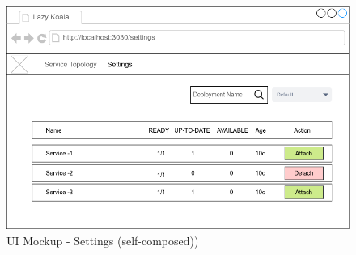 \begin{figure}[H]
    \includegraphics[width=14cm]{assets/system-design/ui-settings.png}
    \caption{UI Mockup - Settings (self-composed))}
\end{figure}